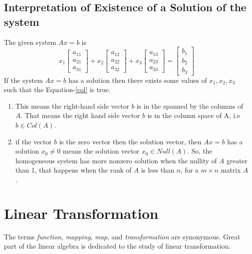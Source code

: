 \documentclass[math101_lecturenotes_ku.tex]{subfiles}
\begin{document}
  \subsection{Interpretation of Existence of a Solution of the system}
  The given system \(Ax=b\) is \\[2mm]
  \begin{equation}
    \label{col}
    x_1 \begin{bmatrix} a_{11} \\ a_{21} \\ a_{31} \end{bmatrix} + x_2 \begin{bmatrix} a_{12} \\ a_{22} \\ a_{32} \end{bmatrix} + x_3 \begin{bmatrix} a_{13} \\ a_{23} \\ a_{33} \end{bmatrix} = \begin{bmatrix} b_1 \\ b_2 \\b_3 \end{bmatrix}
  \end{equation}
  If the system \(Ax=b\) has a solution then there exists some values of \(x_1, x_2 , x_3\) such that the Equation-\ref{col} is true.

  \begin{enumerate}
  \item This means the right-hand side vector \(b\) is in the spanned by the columns of \(A\). That means the right hand side vector \(b\) is in the column space of A, i.e \(b \in Col(A)\).

  \item if the vector \(b\) is the zero vector then the solution vector,
    then \(Ax=b\) has a solution \(x_0 \neq 0\) means the solution vector \(x_0 \in Null(A)\). So, the homogeneous system has more nonzero solution when the nullity of \(A\) greater than 1, that happens when the rank of \(A\) is less than \(n\), for a \(m \times n\) matrix \(A\).
    \end{enumerate}


\section{Linear Transformation}
The terms \textit{function}, \textit{mapping}, \textit{map}, and \textit{transformation} are synonymous. Great part of the linear algebra is dedicated to the study of linear transformation.
\end{document}

